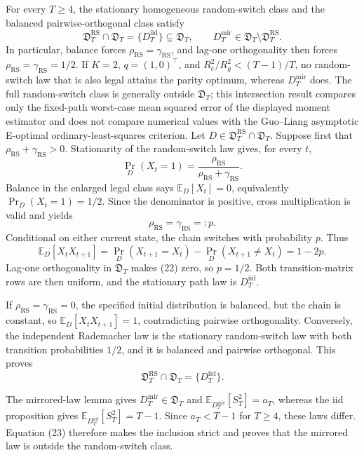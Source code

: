 For every \(T\ge4\), the stationary homogeneous random-switch class and the balanced pairwise-orthogonal class satisfy
\[
\mathfrak D_T^{\mathrm{RS}}\cap\mathfrak D_T=\{D_T^{\mathrm{iid}}\}\subsetneq\mathfrak D_T,
\qquad
D_T^{\mathrm{mir}}\in\mathfrak D_T\setminus\mathfrak D_T^{\mathrm{RS}}.
\]
In particular, balance forces \(\rho_{\mathrm{RS}}=\gamma_{\mathrm{RS}}\), and lag-one orthogonality then forces \(\rho_{\mathrm{RS}}=\gamma_{\mathrm{RS}}=1/2\).  If \(K=2\), \(q=(1,0)^{\top}\), and \(R_e^2/R_g^2<(T-1)/T\), no random-switch law that is also legal attains the parity optimum, whereas \(D_T^{\mathrm{mir}}\) does.  The full random-switch class is generally outside \(\mathfrak D_T\); this intersection result compares only the fixed-path worst-case mean squared error of the displayed moment estimator and does not compare numerical values with the Guo--Liang asymptotic E-optimal ordinary-least-squares criterion.
Let \(D\in\mathfrak D_T^{\mathrm{RS}}\cap\mathfrak D_T\).  Suppose first that \(\rho_{\mathrm{RS}}+\gamma_{\mathrm{RS}}>0\).  Stationarity of the random-switch law gives, for every \(t\),
\[
\Pr_D(X_t=1)=\frac{\rho_{\mathrm{RS}}}{\rho_{\mathrm{RS}}+\gamma_{\mathrm{RS}}}.
\]
Balance in the enlarged legal class says \(\mathbb E_D[X_t]=0\), equivalently \(\Pr_D(X_t=1)=1/2\).  Since the denominator is positive, cross multiplication is valid and yields
\[
\rho_{\mathrm{RS}}=\gamma_{\mathrm{RS}}=:p.
\tag{21}
\]
Conditional on either current state, the chain switches with probability \(p\).  Thus
\[
\mathbb E_D[X_tX_{t+1}]
=\Pr_D(X_{t+1}=X_t)-\Pr_D(X_{t+1}\ne X_t)
=1-2p.
\tag{22}
\]
Lag-one orthogonality in \(\mathfrak D_T\) makes (22) zero, so \(p=1/2\).  Both transition-matrix rows are then uniform, and the stationary path law is \(D_T^{\mathrm{iid}}\).

If \(\rho_{\mathrm{RS}}=\gamma_{\mathrm{RS}}=0\), the specified initial distribution is balanced, but the chain is constant, so \(\mathbb E_D[X_tX_{t+1}]=1\), contradicting pairwise orthogonality.  Conversely, the independent Rademacher law is the stationary random-switch law with both transition probabilities \(1/2\), and it is balanced and pairwise orthogonal.  This proves
\[
\mathfrak D_T^{\mathrm{RS}}\cap\mathfrak D_T=\{D_T^{\mathrm{iid}}\}.
\tag{23}
\]

The mirrored-law lemma gives \(D_T^{\mathrm{mir}}\in\mathfrak D_T\) and \(\mathbb E_{D_T^{\mathrm{mir}}}[S_T^2]=a_T\), whereas the iid proposition gives \(\mathbb E_{D_T^{\mathrm{iid}}}[S_T^2]=T-1\).  Since \(a_T<T-1\) for \(T\ge4\), these laws differ.  Equation (23) therefore makes the inclusion strict and proves that the mirrored law is outside the random-switch class.

